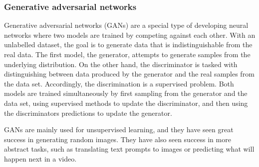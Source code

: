\subsubsection{Generative adversarial networks}
Generative adversarial networks (GANs) are a special type of developing neural networks where two models are trained by competing against each other.
With an unlabelled dataset, the goal is to generate data that is indistinguishable from the real data.
The first model, the generator, attempts to generate samples from the underlying distribution.
On the other hand, the discriminator is tasked with distinguishing between data produced by the generator and the real samples from the data set.
Accordingly, the discrimination is a supervised problem.
Both models are trained simultaneously by first sampling from the generator and the data set, using supervised methods to update the discriminator, and then using the discriminators predictions to update the generator.

GANs are mainly used for unsupervised learning, and they have seen great success in generating random images.
They have also seen success in more abstract tasks, such as translating text prompts to images or predicting what will happen next in a video.